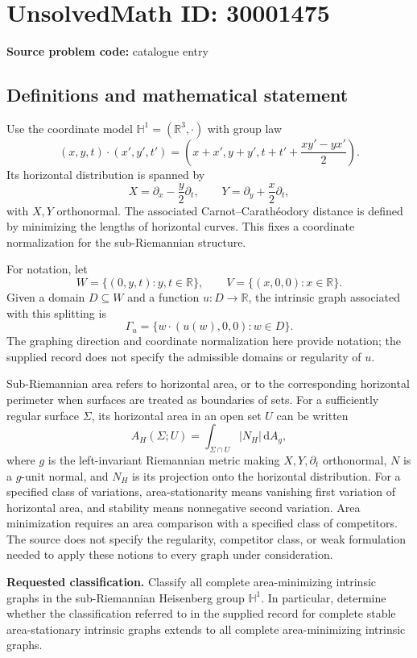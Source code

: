 \documentclass[11pt]{article}
\newcommand{\R}{\mathbb{R}}
\begin{document}
\section*{UnsolvedMath ID: 30001475}
\textbf{Source problem code:} catalogue entry
\subsection{Definitions and mathematical statement}
Use the coordinate model \(\mathbb H^1=(\R^3,\cdot)\) with group law
\[
(x,y,t)\cdot(x',y',t')=
\left(x+x',y+y',t+t'+\frac{xy'-yx'}2\right).
\]
Its horizontal distribution is spanned by
\[
X=\partial_x-\frac y2\partial_t,
\qquad
Y=\partial_y+\frac x2\partial_t,
\]
with \(X,Y\) orthonormal. The associated Carnot--Carath\'eodory distance is defined by minimizing the lengths of horizontal curves. This fixes a coordinate normalization for the sub-Riemannian structure.

For notation, let
\[
W=\{(0,y,t):y,t\in\R\},\qquad
V=\{(x,0,0):x\in\R\}.
\]
Given a domain \(D\subseteq W\) and a function \(u:D\to\R\), the intrinsic graph associated with this splitting is
\[
\Gamma_u=\{w\cdot(u(w),0,0):w\in D\}.
\]
The graphing direction and coordinate normalization here provide notation; the supplied record does not specify the admissible domains or regularity of \(u\).

Sub-Riemannian area refers to horizontal area, or to the corresponding horizontal perimeter when surfaces are treated as boundaries of sets. For a sufficiently regular surface \(\Sigma\), its horizontal area in an open set \(U\) can be written
\[
A_H(\Sigma;U)=\int_{\Sigma\cap U}|N_H|\,\mathrm dA_g,
\]
where \(g\) is the left-invariant Riemannian metric making \(X,Y,\partial_t\) orthonormal, \(N\) is a \(g\)-unit normal, and \(N_H\) is its projection onto the horizontal distribution. For a specified class of variations, area-stationarity means vanishing first variation of horizontal area, and stability means nonnegative second variation. Area minimization requires an area comparison with a specified class of competitors. The source does not specify the regularity, competitor class, or weak formulation needed to apply these notions to every graph under consideration.

\textbf{Requested classification.} Classify all complete area-minimizing intrinsic graphs in the sub-Riemannian Heisenberg group \(\mathbb H^1\). In particular, determine whether the classification referred to in the supplied record for complete stable area-stationary intrinsic graphs extends to all complete area-minimizing intrinsic graphs.
\end{document}
